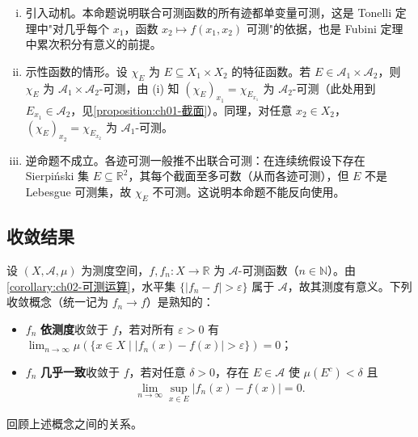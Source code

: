\documentclass[../../main.tex]{subfiles}%
\begin{document}
\begin{remark}\label{remark:ch02-截面可测}
\label{remark:ch02-截口可测}
\begin{enumerate}[(i)]
\item 引入动机。本命题说明联合可测函数的所有迹都单变量可测，这是 Tonelli 定理中"对几乎每个 $x_1$，函数 $x_2\mapsto f(x_1,x_2)$ 可测"的依据，也是 Fubini 定理中累次积分有意义的前提。
\item 示性函数的情形。设 $\chi_E$ 为 $E\subseteq X_1\times X_2$ 的特征函数。若 $E\in\mathscr A_1\times\mathscr A_2$，则 $\chi_E$ 为 $\mathscr A_1\times\mathscr A_2$-可测，由 (i) 知 $(\chi_E)_{x_1}=\chi_{E_{x_1}}$ 为 $\mathscr A_2$-可测（此处用到 $E_{x_1}\in\mathscr A_2$，见\cref{proposition:ch01-截面}）。同理，对任意 $x_2\in X_2$，$(\chi_E)_{x_2}=\chi_{E_{x_2}}$ 为 $\mathscr A_1$-可测。
\item 逆命题不成立。各迹可测一般推不出联合可测：在连续统假设下存在 Sierpiński 集 $E\subseteq\mathbb{R}^2$，其每个截面至多可数（从而各迹可测），但 $E$ 不是 Lebesgue 可测集，故 $\chi_E$ 不可测。这说明本命题不能反向使用。
\end{enumerate}
\end{remark}

\subsection{收敛结果}\label{subsection:ch02-收敛结果}

设 $(X,\mathscr A,\mu)$ 为测度空间，$f,f_n:X\to\mathbb{R}$ 为 $\mathscr A$-可测函数（$n\in\mathbb{N}$）。由\cref{corollary:ch02-可测运算}，水平集 $\{|f_n-f|>\varepsilon\}$ 属于 $\mathscr A$，故其测度有意义。下列收敛概念（统一记为 $f_n\to f$）是熟知的：
\begin{itemize}
\item $f_n$ \textbf{依测度}收敛于 $f$，若对所有 $\varepsilon>0$ 有 $\lim_{n\to\infty}\mu(\{x\in X\mid|f_n(x)-f(x)|>\varepsilon\})=0$；
\item $f_n$ \textbf{几乎一致}收敛于 $f$，若对任意 $\delta>0$，存在 $E\in\mathscr A$ 使 $\mu(E^c)<\delta$ 且
\begin{align}
\lim_{n\to\infty}\sup_{x\in E}|f_n(x)-f(x)|=0. \label{align:ch02-2.3}
\end{align}
\end{itemize}

回顾上述概念之间的关系。
\end{document}
